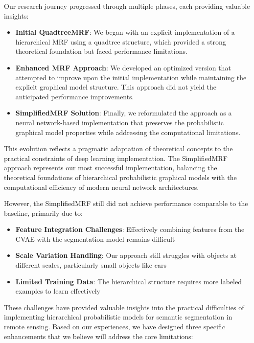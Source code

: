 \documentclass[conference]{IEEEtran}
\begin{document}
Our research journey progressed through multiple phases, each providing valuable insights:

\begin{itemize}
    \item \textbf{Initial QuadtreeMRF}: We began with an explicit implementation of a hierarchical MRF using a quadtree structure, which provided a strong theoretical foundation but faced performance limitations.
    
    \item \textbf{Enhanced MRF Approach}: We developed an optimized version that attempted to improve upon the initial implementation while maintaining the explicit graphical model structure. This approach did not yield the anticipated performance improvements.
    
    \item \textbf{SimplifiedMRF Solution}: Finally, we reformulated the approach as a neural network-based implementation that preserves the probabilistic graphical model properties while addressing the computational limitations.
\end{itemize}

This evolution reflects a pragmatic adaptation of theoretical concepts to the practical constraints of deep learning implementation. The SimplifiedMRF approach represents our most successful implementation, balancing the theoretical foundations of hierarchical probabilistic graphical models with the computational efficiency of modern neural network architectures.

However, the SimplifiedMRF still did not achieve performance comparable to the baseline, primarily due to:

\begin{itemize}
    \item \textbf{Feature Integration Challenges}: Effectively combining features from the CVAE with the segmentation model remains difficult
    
    \item \textbf{Scale Variation Handling}: Our approach still struggles with objects at different scales, particularly small objects like cars
    
    \item \textbf{Limited Training Data}: The hierarchical structure requires more labeled examples to learn effectively
\end{itemize}

These challenges have provided valuable insights into the practical difficulties of implementing hierarchical probabilistic models for semantic segmentation in remote sensing. Based on our experiences, we have designed three specific enhancements that we believe will address the core limitations:
\end{document}
